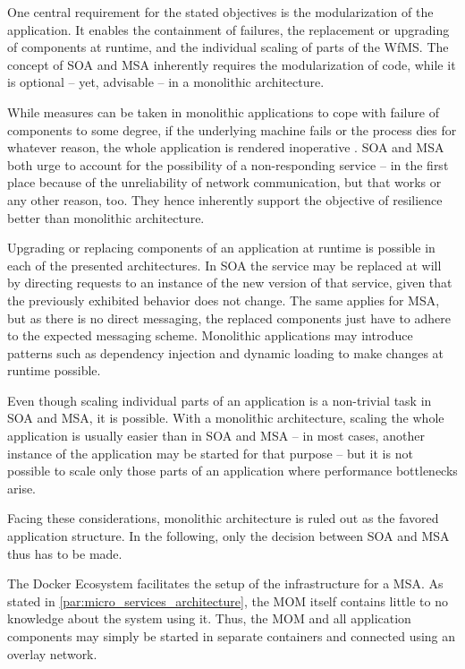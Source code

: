   One central requirement for the stated objectives is the modularization of the application. It enables the containment of failures, the replacement or upgrading of components at runtime, and the individual scaling of parts of the \ac{WfMS}. The concept of \ac{SOA} and \ac{MSA} inherently requires the modularization of code, while it is optional -- yet, advisable -- in a monolithic architecture.

  While measures can be taken in monolithic applications to cope with failure of components to some degree, if the underlying machine fails or the process dies for whatever reason, the whole application is rendered inoperative \cite[p.~55]{Newman2015Building}. \ac{SOA} and \ac{MSA} both urge to account for the possibility of a non-responding service -- in the first place because of the unreliability of network communication, but that works or any other reason, too. They hence inherently support the objective of resilience better than monolithic architecture.

  Upgrading or replacing components of an application at runtime is possible in each of the presented architectures. In \ac{SOA} the service may be replaced at will by directing requests to an instance of the new version of that service, given that the previously exhibited behavior does not change. The same applies for \ac{MSA}, but as there is no direct messaging, the replaced components just have to adhere to the expected messaging scheme. Monolithic applications may introduce patterns such as dependency injection and dynamic loading to make changes at runtime possible.

  Even though scaling individual parts of an application is a non-trivial task in \ac{SOA} and \ac{MSA}, it is possible. With a monolithic architecture, scaling the whole application is usually easier than in \ac{SOA} and \ac{MSA} -- in most cases, another instance of the application may be started for that purpose -- but it is not possible to scale only those parts of an application where performance bottlenecks arise.

  Facing these considerations, monolithic architecture is ruled out as the favored application structure. In the following, only the decision between \ac{SOA} and \ac{MSA} thus has to be made.

  The Docker Ecosystem facilitates the setup of the infrastructure for a \ac{MSA}. As stated in \ref{par:micro_services_architecture}, the \ac{MOM} itself contains little to no knowledge about the system using it. Thus, the \ac{MOM} and all application components may simply be started in separate containers and connected using an overlay network.

